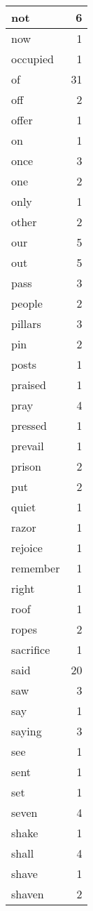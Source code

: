 \begin{center}
\begin{longtable}{l|r}
not & 6\\ \hline 
now & 1\\ \hline 
occupied & 1\\ \hline 
of & 31\\ \hline 
off & 2\\ \hline 
offer & 1\\ \hline 
on & 1\\ \hline 
once & 3\\ \hline 
one & 2\\ \hline 
only & 1\\ \hline 
other & 2\\ \hline 
our & 5\\ \hline 
out & 5\\ \hline 
pass & 3\\ \hline 
people & 2\\ \hline 
pillars & 3\\ \hline 
pin & 2\\ \hline 
posts & 1\\ \hline 
praised & 1\\ \hline 
pray & 4\\ \hline 
pressed & 1\\ \hline 
prevail & 1\\ \hline 
prison & 2\\ \hline 
put & 2\\ \hline 
quiet & 1\\ \hline 
razor & 1\\ \hline 
rejoice & 1\\ \hline 
remember & 1\\ \hline 
right & 1\\ \hline 
roof & 1\\ \hline 
ropes & 2\\ \hline 
sacrifice & 1\\ \hline 
said & 20\\ \hline 
saw & 3\\ \hline 
say & 1\\ \hline 
saying & 3\\ \hline 
see & 1\\ \hline 
sent & 1\\ \hline 
set & 1\\ \hline 
seven & 4\\ \hline 
shake & 1\\ \hline 
shall & 4\\ \hline 
shave & 1\\ \hline 
shaven & 2\\ \hline 

\end{longtable}
\end{center}
